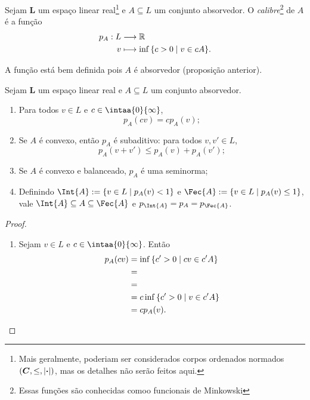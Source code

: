 \begin{defi}
Sejam $\bm L$ um espaço linear real\footnote{Mais geralmente, poderiam ser considerados corpos ordenados normados $(\bm C,\leq,\left\vert{\bm{\cdot}}\right\vert)$, mas os detalhes não serão feitos aqui.} e $A \subseteq L$ um conjunto absorvedor. O \emph{calibre}\footnote{Essas funções são conhecidas comoo funcionais de Minkowski} de $A$ é a função
	\begin{align*}
	{p_A}: {L} &\longrightarrow {\mathbb{R}} \\{v} &\longmapsto {\inf\left\{c>0 \;\middle\vert\; v \in cA \right\}}.
	\end{align*}
\end{defi}

A função está bem definida pois $A$ é absorvedor (proposição anterior).

\begin{prop}
Sejam $\bm L$ um espaço linear real e $A \subseteq L$ um conjunto absorvedor.
	\begin{enumerate}
	\item Para todos $v \in L$ e $c \in \intaa{0}{\infty}$,
		\begin{equation*}
		p_A(cv) = c p_A(v);
		\end{equation*}
	\item Se $A$ é convexo, então $p_A$ é subaditivo: para todos $v,v' \in L$,
		\begin{equation*}
		p_A(v+v') \leq p_A(v) + p_{A}(v');
		\end{equation*}
	\item Se $A$ é convexo e balanceado, $p_A$ é uma seminorma;
	\item Definindo $\Int{A} := \set{v \in L}{p_A(v) < 1}$ e $\Fec{A} := \set{v \in L}{p_A(v) \leq 1}$, vale $\Int{A} \subseteq A \subseteq \Fec{A}$ e $p_{\Int{A}} = p_{A} = p_{\Fec{A}}$.
	\end{enumerate}
\end{prop}
\begin{proof}
	\begin{enumerate}
	\item Sejam $v \in L$ e $c \in \intaa{0}{\infty}$. Então
		\begin{align*}
		p_A(cv) &= \inf\left\{c'>0 \;\middle\vert\; cv \in c'A \right\} \\
					&= \\
					&= \\
					&= c\inf\left\{c'>0 \;\middle\vert\; v \in c'A \right\} \\
					&= c p_A(v).
		\end{align*}
	\end{enumerate}
\end{proof}








